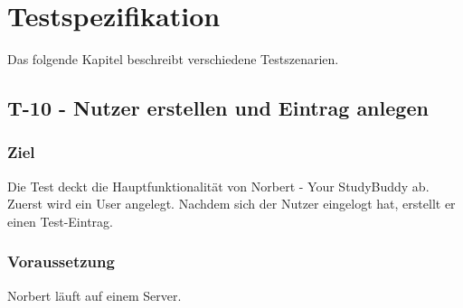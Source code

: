 
\chapter{Testspezifikation}
Das folgende Kapitel beschreibt verschiedene Testszenarien.

\section{T-10 - Nutzer erstellen und Eintrag anlegen}
\subsection{Ziel}
Die Test deckt die Hauptfunktionalität von Norbert - Your StudyBuddy ab. Zuerst wird ein User angelegt. Nachdem sich der Nutzer eingelogt hat, erstellt er einen Test-Eintrag.

\subsection{Voraussetzung}
Norbert läuft auf einem Server. 


